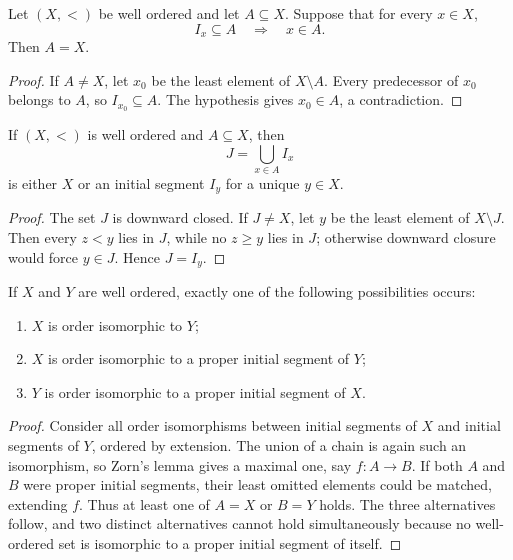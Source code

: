 \begin{thm}
Let $(X,<)$ be well ordered and let $A\subseteq X$. Suppose that for every $x\in X$,
\[
I_x\subseteq A \quad\Longrightarrow\quad x\in A.
\]
Then $A=X$.
\end{thm}

\begin{proof}
If $A\neq X$, let $x_0$ be the least element of $X\setminus A$. Every predecessor of $x_0$ belongs to $A$, so $I_{x_0}\subseteq A$. The hypothesis gives $x_0\in A$, a contradiction.
\end{proof}

\begin{prop}
If $(X,<)$ is well ordered and $A\subseteq X$, then
\[
J=\bigcup_{x\in A}I_x
\]
is either $X$ or an initial segment $I_y$ for a unique $y\in X$.
\end{prop}

\begin{proof}
The set $J$ is downward closed. If $J\neq X$, let $y$ be the least element of $X\setminus J$. Then every $z<y$ lies in $J$, while no $z\geq y$ lies in $J$; otherwise downward closure would force $y\in J$. Hence $J=I_y$.
\end{proof}

\begin{prop}
If $X$ and $Y$ are well ordered, exactly one of the following possibilities occurs:
\begin{enumerate}
  \item $X$ is order isomorphic to $Y$;
  \item $X$ is order isomorphic to a proper initial segment of $Y$;
  \item $Y$ is order isomorphic to a proper initial segment of $X$.
\end{enumerate}
\end{prop}

\begin{proof}
Consider all order isomorphisms between initial segments of $X$ and initial segments of $Y$, ordered by extension. The union of a chain is again such an isomorphism, so Zorn's lemma gives a maximal one, say $f:A\to B$. If both $A$ and $B$ were proper initial segments, their least omitted elements could be matched, extending $f$. Thus at least one of $A=X$ or $B=Y$ holds. The three alternatives follow, and two distinct alternatives cannot hold simultaneously because no well-ordered set is isomorphic to a proper initial segment of itself.
\end{proof}


